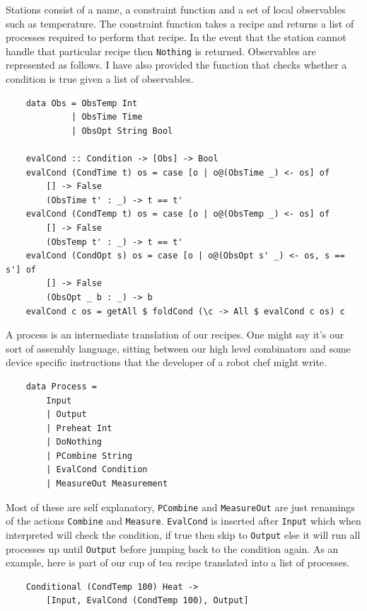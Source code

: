 \documentclass[11pt]{article}
\begin{document}
Stations consist of a name, a constraint function and a set of local observables such as temperature.
The constraint function takes a recipe and returns a list of processes required to perform that recipe.
In the event that the station cannot handle that particular recipe then \texttt{Nothing} is returned.
Observables are represented as follows. I have also provided the function that checks whether a
condition is true given a list of observables.

\begin{lstlisting}
    data Obs = ObsTemp Int
             | ObsTime Time
             | ObsOpt String Bool

    evalCond :: Condition -> [Obs] -> Bool
    evalCond (CondTime t) os = case [o | o@(ObsTime _) <- os] of
        [] -> False
        (ObsTime t' : _) -> t == t'
    evalCond (CondTemp t) os = case [o | o@(ObsTemp _) <- os] of
        [] -> False
        (ObsTemp t' : _) -> t == t'
    evalCond (CondOpt s) os = case [o | o@(ObsOpt s' _) <- os, s == s'] of
        [] -> False
        (ObsOpt _ b : _) -> b
    evalCond c os = getAll $ foldCond (\c -> All $ evalCond c os) c
\end{lstlisting}

A process is an intermediate translation of our recipes. One might say it's our sort of assembly
language, sitting between our high level combinators and some device specific instructions that the
developer of a robot chef might write.

\begin{lstlisting}
    data Process =
        Input
        | Output
        | Preheat Int
        | DoNothing
        | PCombine String
        | EvalCond Condition
        | MeasureOut Measurement
\end{lstlisting}

Most of these are self explanatory, \texttt{PCombine} and \texttt{MeasureOut} are just renamings of
the actions \texttt{Combine} and \texttt{Measure}. \texttt{EvalCond} is inserted after \texttt{Input}
which when interpreted will check the condition, if true then skip to \texttt{Output} else it will
run all processes up until \texttt{Output} before jumping back to the condition again. As an example,
here is part of our cup of tea recipe translated into a list of processes.

\begin{lstlisting}
    Conditional (CondTemp 100) Heat ->
        [Input, EvalCond (CondTemp 100), Output]
\end{lstlisting}
\end{document}
